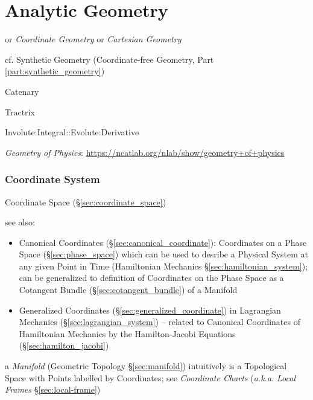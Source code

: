 \part{Analytic Geometry}\label{part:analytic_geometry}

or \emph{Coordinate Geometry} or \emph{Cartesian Geometry}

\fist cf. Synthetic Geometry (Coordinate-free Geometry, Part
\ref{part:synthetic_geometry})

Catenary

Tractrix

Involute:Integral::Evolute:Derivative


\fist \emph{Geometry of Physics}:
\url{https://ncatlab.org/nlab/show/geometry+of+physics}



\section{Coordinate System}\label{sec:coordinate_system}

Coordinate Space (\S\ref{sec:coordinate_space})

see also:
\begin{itemize}
  \item Canonical Coordinates (\S\ref{sec:canonical_coordinate}): Coordinates on
    a Phase Space (\S\ref{sec:phase_space}) which can be used to desribe a
    Physical System at any given Point in Time (Hamiltonian Mechanics
    \S\ref{sec:hamiltonian_system}); can be generalized to definition of
    Coordinates on the Phase Space as a Cotangent Bundle
    (\S\ref{sec:cotangent_bundle}) of a Manifold
  \item Generalized Coordinates (\S\ref{sec:generalized_coordinate}) in
    Lagrangian Mechanics (\S\ref{sec:lagrangian_system}) -- related to Canonical
    Coordinates of Hamiltonian Mechanics by the Hamilton-Jacobi Equations
    (\S\ref{sec:hamilton_jacobi})
\end{itemize}

\fist a \emph{Manifold} (Geometric Topology \S\ref{sec:manifold}) intuitively is
a Topological Space with Points labelled by Coordinates; see \emph{Coordinate
  Charts} (\emph{a.k.a.} \emph{Local Frames} \S\ref{sec:local-frame})



